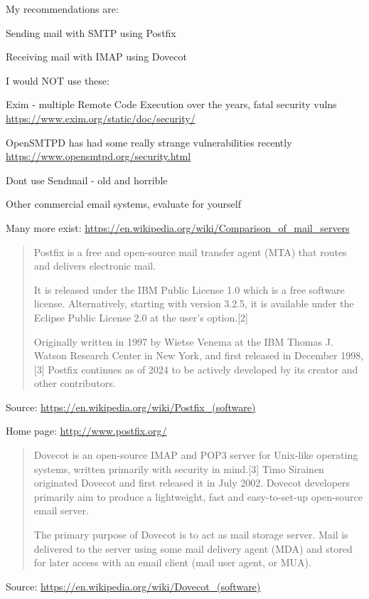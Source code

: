 \documentclass[Screen16to9,17pt]{foils}
\begin{document}

My recommendations are:
\begin{list2}
\item Sending mail with SMTP using Postfix
\item Receiving mail with IMAP using Dovecot
\end{list2}

I would NOT use these:
\begin{list2}
\item Exim - multiple Remote Code Execution over the years, fatal security vulns \\
\url{https://www.exim.org/static/doc/security/}
\item OpenSMTPD has had some really strange vulnerabilities recently\\
\url{https://www.opensmtpd.org/security.html}
\item Dont use Sendmail - old and horrible
\item Other commercial email systems, evaluate for yourself
\end{list2}


Many more exist: \url{https://en.wikipedia.org/wiki/Comparison_of_mail_servers}



\begin{quote}
Postfix is a free and open-source mail transfer agent (MTA) that routes and delivers electronic mail.

It is released under the IBM Public License 1.0 which is a free software license. Alternatively, starting with version 3.2.5, it is available under the Eclipse Public License 2.0 at the user's option.[2]

Originally written in 1997 by Wietse Venema at the IBM Thomas J. Watson Research Center in New York, and first released in December 1998,[3] Postfix continues as of 2024 to be actively developed by its creator and other contributors.
\end{quote}
Source: \url{https://en.wikipedia.org/wiki/Postfix_(software)}

Home page: \url{http://www.postfix.org/}



\begin{quote}
Dovecot is an open-source IMAP and POP3 server for Unix-like operating systems, written primarily with security in mind.[3] Timo Sirainen originated Dovecot and first released it in July 2002. Dovecot developers primarily aim to produce a lightweight, fast and easy-to-set-up open-source email server.

The primary purpose of Dovecot is to act as mail storage server. Mail is delivered to the server using some mail delivery agent (MDA) and stored for later access with an email client (mail user agent, or MUA).
\end{quote}
Source: \url{https://en.wikipedia.org/wiki/Dovecot_(software)}
\end{document}
